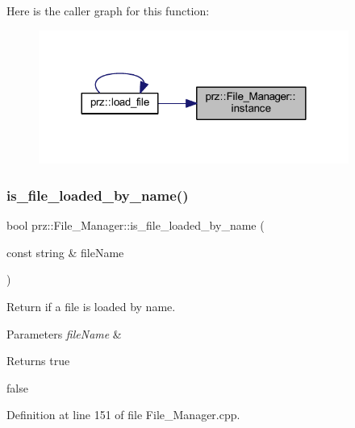 Here is the caller graph for this function\+:
\nopagebreak
\begin{figure}[H]
\begin{center}
\leavevmode
\includegraphics[width=288pt]{classprz_1_1_file___manager_a01f8e98b44d904709af8ec7f9bf91f3a_icgraph}
\end{center}
\end{figure}
\mbox{\label{classprz_1_1_file___manager_a57fba84490a328ce3b244198272be7f4}} 
\subsubsection{\texorpdfstring{is\_file\_loaded\_by\_name()}{is\_file\_loaded\_by\_name()}}
{\footnotesize\ttfamily bool prz\+::\+File\+\_\+\+Manager\+::is\+\_\+file\+\_\+loaded\+\_\+by\+\_\+name (\begin{DoxyParamCaption}\item[{const string \&}]{file\+Name }\end{DoxyParamCaption})}



Return if a file is loaded by name. 


\begin{DoxyParams}{Parameters}
{\em file\+Name} & \\
\hline
\end{DoxyParams}
\begin{DoxyReturn}{Returns}
true 

false 
\end{DoxyReturn}


Definition at line 151 of file File\+\_\+\+Manager.\+cpp.

